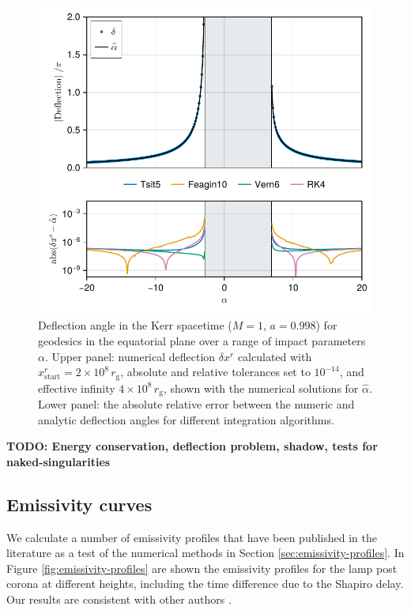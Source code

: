 \documentclass[fleqn,usenatbib]{mnras}
\newcommand{\todo}[1]{{\noindent \bf \color{red} TODO: #1}}
\newcommand{\rg}{r_\text{g}}
\begin{document}
\begin{figure}
	\centering
	\includegraphics[width=0.94\linewidth]{figures/deflection.iyer-hansen.pdf}
	\caption{Deflection angle in the Kerr spacetime ($M = 1$, $a = 0.998$) for geodesics in the equatorial plane over a range of impact parameters $\alpha$. Upper panel: numerical deflection $\delta x^r$ calculated with  $x^r_\text{start} = 2 \times 10^8 \, \rg$, absolute and relative tolerances set to $10^{-14}$, and effective infinity $4 \times 10^8\, \rg$, shown with the numerical solutions for $\hat{\alpha}$. Lower panel: the absolute relative error between the numeric and analytic deflection angles for different integration algorithms.}
	\label{fig:deflection-angle}
\end{figure}


\todo{Energy conservation, deflection problem, shadow, tests for naked-singularities}


\subsection{Emissivity curves}

We calculate a number of emissivity profiles that have been published in the literature as a test of the numerical methods in Section \ref{sec:emissivity-profiles}. In Figure \ref{fig:emissivity-profiles} are shown the emissivity profiles for the lamp post corona at different heights, including the time difference due to the Shapiro delay. Our results are consistent with other authors \citep{wilkins_understanding_2012,dauser_irradiation_2013}.
\end{document}
